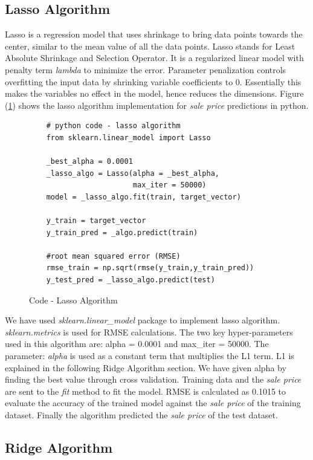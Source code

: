 \documentclass[sigconf]{acmart}
\begin{document}
	\subsection{Lasso Algorithm}
	
	Lasso is a regression model that uses shrinkage to bring data points towards the center, similar to the mean value of all the data points. Lasso stands for Least Absolute Shrinkage and Selection Operator. It is a regularized linear model with penalty term {\em lambda} to minimize the error. Parameter penalization controls overfitting the input data by shrinking variable coefficients to 0. Essentially this makes the variables no effect in the model, hence reduces the dimensions. Figure (\ref{c:lasso}) shows the lasso algorithm implementation for {\em sale price} predictions in python.
		
	\begin{figure}[htb]
	\begin{verbatim}	
	# python code - lasso algorithm
	from sklearn.linear_model import Lasso
		
	_best_alpha = 0.0001		
	_lasso_algo = Lasso(alpha = _best_alpha, 
	                    max_iter = 50000)	
	model = _lasso_algo.fit(train, target_vector)  
		
	y_train = target_vector
	y_train_pred = _algo.predict(train)
	
	#root mean squared error (RMSE)
	rmse_train = np.sqrt(rmse(y_train,y_train_pred))		
	y_test_pred = _lasso_algo.predict(test)	
	\end{verbatim}
	\caption{Code - Lasso Algorithm} \label{c:lasso} 
	\end{figure}
	
	We have used {\em sklearn.linear\_model} package to implement lasso algorithm. {\em sklearn.metrics} is used for RMSE calculations. The two key hyper-parameters used in this algorithm are: alpha = 0.0001 and max\_iter = 50000. The parameter: {\em alpha} is used as a constant term that multiplies the L1 term. L1 is explained in the following Ridge Algorithm section. We have given alpha by finding the best value through cross validation. Training data and the {\em sale price} are sent to the {\em fit} method to fit the model. RMSE is calculated as 0.1015 to evaluate the accuracy of the trained model against the {\em sale price} of the training dataset. Finally the algorithm predicted the {\em sale price} of the test dataset.
	
	\subsection{Ridge Algorithm}
	
\end{document}
